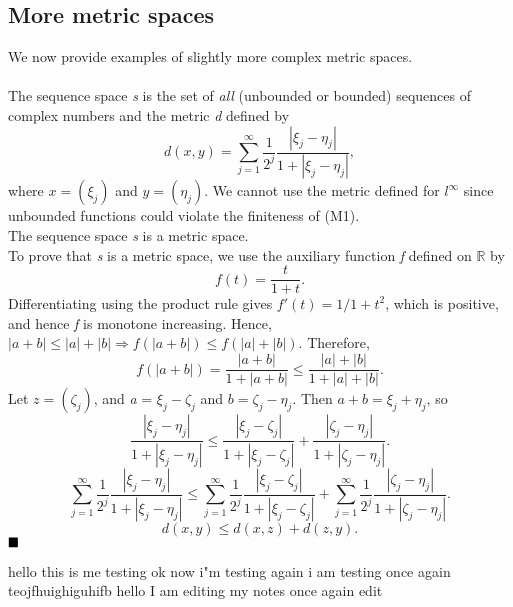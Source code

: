\documentclass[11pt]{article}
\newcommand{\defn}[0]{\tcbhighmath[boxrule=0.5mm, colframe=cyan!20, colback=cyan!20, arc=10mm, size=fbox]{\mathrm{DEF:}}}
\newcommand{\thm}[0]{\tcbhighmath[boxrule=0.2mm, colframe=Melon, colback=Melon, arc=10mm, size=fbox]{\mathrm{Thm:}}}
\newcommand{\thmpf}[0]{\tcbhighmath[boxrule=0.5mm, colframe=Melon, colback=white, arc=10mm, size=fbox]{\mathrm{Proof:}}}
\begin{document}
\subsection{More metric spaces}
We now provide examples of slightly more complex metric spaces.
\\\\
\noindent
\defn{}
The sequence space \textit{s} is the set of \textit{all} (unbounded or bounded) sequences of complex numbers and the metric \textit{d} defined by
$$d(x, y) = \sum_{j=1}^\infty \frac{1}{2^j}\frac{|\xi_j - \eta_j|}{1 + |\xi_j - \eta_j|},$$
where $x = (\xi_j)$ and $y = (\eta_j)$. We cannot use the metric defined for $l^\infty$ since unbounded functions could violate the finiteness of (M1).
\\
\thm{} The sequence space \textit{s} is a metric space. 
\\\thmpf{}
To prove that \textit{s} is a metric space, we use the auxiliary function \textit{f} defined on $\mathbb{R}$ by
$$ f(t) = \frac{t}{1+t}.$$
Differentiating using the product rule gives $f'(t) = 1/{1+t}^2$, which is positive, and hence \textit{f} is monotone increasing. Hence, $|a + b| \leq |a| + |b| \Rightarrow f(|a+b|) \leq f(|a| + |b|).$ Therefore,
$$ f(|a + b|) = \frac{|a+b|}{1 + |a+b|} \leq \frac{|a| +|b|}{1 + |a| + |b|}.$$
Let $z = (\zeta_j)$, and \textit{a} = $\xi_j - \zeta_j$ and $\textit{b} = \zeta_j - \eta_j$. Then $a + b = \xi_j + \eta_j$, so 
$$\frac{|\xi_j - \eta_j|}{1 +|\xi_j - \eta_j|} \leq \frac{|\xi_j - \zeta_j|}{1+ |\xi_j - \zeta_j|} + \frac{|\zeta_j - \eta_j|}{1+|\zeta_j - \eta_j|}.$$
$$\sum_{j=1}^{\infty}\frac{1}{2^j}\frac{|\xi_j - \eta_j|}{1 +|\xi_j - \eta_j|} \leq \sum_{j=1}^{\infty}\frac{1}{2^j}\frac{|\xi_j - \zeta_j|}{1+ |\xi_j - \zeta_j|} + \sum_{j=1}^{\infty}\frac{1}{2^j}\frac{|\zeta_j - \eta_j|}{1+|\zeta_j - \eta_j|}.$$
$$d(x,y) \leq d(x, z) + d(z, y).$$ $\hfill \blacksquare$

hello this is me testing
ok now i"m testing again
i am testing once again
teojfhuighiguhifb
hello I am editing my notes
once again edit
\end{document}

